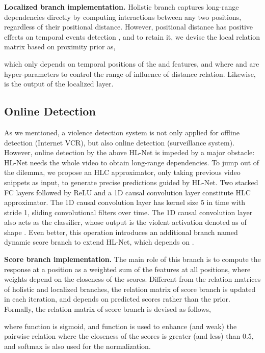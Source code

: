\documentclass[runningheads]{llncs}
\begin{document}
\noindent\textbf{Localized branch implementation.} Holistic branch captures long-range dependencies directly by computing interactions between any two positions, regardless of their positional distance. However, positional distance has positive effects on temporal events detection \cite{zhong2019graph}, and to retain it, we devise the local relation matrix based on proximity prior as,
	 

which only depends on temporal positions of the  and  features, and where  and  are hyper-parameters to control the range of influence of distance relation. Likewise,  is the output of the  localized layer. 

\subsection{Online Detection}

As we mentioned, a violence detection system is not only applied for offline detection (Internet VCR), but also online detection (surveillance system). However, online detection by the above HL-Net is impeded by a major obstacle: HL-Net needs the whole video to obtain long-range dependencies. To jump out of the dilemma, we propose an HLC approximator, only taking previous video snippets as input, to generate precise predictions guided by HL-Net. Two stacked FC layers followed by ReLU and a 1D causal convolution layer constitute HLC approximator. The 1D causal convolution layer has kernel size 5 in time with stride 1, sliding convolutional filters over time. The 1D causal convolution layer also acts as the classifier, whose output is the violent activation denoted as  of shape . Even better, this operation introduces an additional branch named dynamic score branch to extend HL-Net, which depends on . 

\noindent\textbf{Score branch implementation.} The main role of this branch is to compute the response at a position as a weighted sum of the features at all positions, where weights depend on the closeness of the scores. Different from the relation matrices of holistic and localized branches, the relation matrix of score branch is updated in each iteration, and depends on predicted scores rather than the prior. Formally, the relation matrix of score branch is devised as follows, 
	 

	 

where function  is sigmoid, and function  is used to enhance (and weak) the pairwise relation where the closeness of the scores is greater (and less) than 0.5, and softmax is also used for the normalization.
\end{document}
